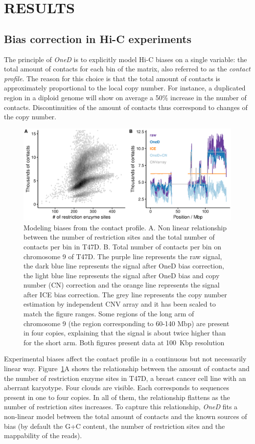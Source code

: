 \documentclass[a4,center,fleqn]{NAR}
\begin{document}
\section{RESULTS}

\subsection{Bias correction in Hi-C experiments}

The principle of \textit{OneD} is to explicitly model Hi-C biases on a
single variable: the total amount of contacts for each bin of the matrix,
also referred to as the \textit{contact profile}. The reason for this
choice is that the total amount of contacts is approximately proportional
to the local copy number. For instance, a duplicated region in a diploid
genome will show on average a 50\% increase in the number of contacts.
Discontinuities of the amount of contacts thus correspond to changes of
the copy number.

\begin{figure}
\centerline{\includegraphics[width=.49\textwidth]
  {nar_figures/figure_1.eps}}
\caption{Modeling biases from the contact profile. A. Non linear
relationship between the number of restriction sites and the total number
of contacts per bin in T47D. B. Total number of contacts per bin on
chromosome 9 of T47D. The purple line represents the raw signal, the dark blue
line represents the signal after OneD bias correction, the light blue line
represents the signal after OneD bias and copy number (CN) correction and
the orange line represents the signal after ICE bias correction. The grey
line represents the copy number estimation by independent CNV array and it
has been scaled to match the figure ranges. Some regions of the long arm of
chromosome 9 (the region corresponding to 60-140 Mbp) are present in four
copies, explaining that the signal is about twice higher than for the short
arm. Both figures present data at 100~Kbp resolution}
\label{fig:totals}
\end{figure}


Experimental biases affect the contact profile in a continuous but not
necessarily linear way. Figure~\ref{fig:totals}A shows the relationship
between the amount of contacts and the number of restriction enzyme sites
in T47D, a breast cancer cell line with an aberrant karyotype.  Four
clouds are visible. Each corresponds to sequences present in one to four
copies. In all of them, the relationship flattens as the number of
restriction sites increases. To capture this relationship, \textit{OneD}
fits a non-linear model between the total amount of contacts and the known
sources of bias (by default the G+C content, the number of restriction
sites and the mappability of the reads).
\end{document}
